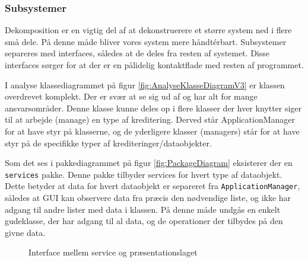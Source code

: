 \subsubsection{Subsystemer}%
\label{ssub:subsystemer}

Dekomposition er en vigtig del af at dekonstruerere et større system ned i flere
små dele. På denne måde bliver vores system mere håndtérbart. Subsystemer
separeres med interfaces, således at de deles fra resten af systemet. Disse
interfaces sørger for at der er en pålidelig kontaktflade med resten af
programmet.

I analyse klassediagrammet på figur \ref{fig:AnalyseKlasseDiagramV3} er klassen overdrevet komplekt. Der er svær at se sig ud af og har alt for mange ansvarsområder. Denne klasse kunne deles op i flere klasser der hver knytter siger til at arbejde (manage) en type af kreditering. Derved står ApplicationManager for at have styr på klasserne, og de yderligere klasser (managers) står for at have styr på de specifikke typer af krediteringer/dataobjekter. 

Som det ses i pakkediagrammet på figur \ref{fig:PackageDiagram} 
eksisterer der en \texttt{services} pakke. Denne pakke tilbyder services for
hvert type af dataobjekt. Dette betyder at data for hvert dataobjekt er
separeret fra \texttt{ApplicationManager}, således at GUI kan observere data fra
præcis den nødvendige liste, og ikke har adgang til andre lister med data i
klassen. På denne måde undgås en enkelt gudeklasse, der har adgang til al data,
og de operationer der tilbydes på den givne data.

\begin{figure}[H]
    \centering
    \caption{Interface mellem service og præsentationslaget}
\end{figure}

